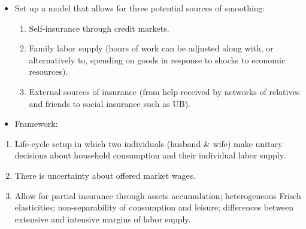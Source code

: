 \documentclass[notes=show]{beamer}
\begin{document}
\begin{frame}%



\begin{itemize}
\item Set up a model that allows for three potential sources of smoothing:

\begin{enumerate}
\item Self-insurance through credit markets.

\item Family labor supply (hours of work can be adjusted along with, or
alternatively to, spending on goods in response to shocks to economic
resources).

\item External sources of insurance (from help received by networks of
relatives and friends to social insurance such as UB).
\end{enumerate}

\item Framework:
\end{itemize}

\begin{enumerate}
\item Life-cycle setup in which two individuals (husband \& wife) make
unitary decisions about household consumption and their individual labor
supply.

\item There is uncertainty about offered market wages.

\item Allow for partial insurance through assets accumulation; heterogeneous
Frisch elasticities; non-separability of consumption and leisure;
differences between extensive and intensive margins of labor supply.
\end{enumerate}

\transboxout%
\end{frame}%

\bigskip
\end{document}
